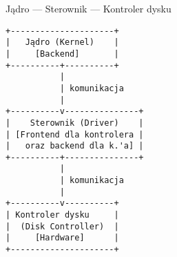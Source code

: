 \documentclass[10pt,compress,usenames,dvipsnames,aspectratio=169]{beamer}
\begin{document}
\begin{frame}[fragile]{Jądro — Sterownik — Kontroler dysku}
  \vfill
  \begin{center}
    \begin{minipage}{0.4\textwidth}
      {\scriptsize
      \begin{lstlisting}[style=dark, basicstyle=\ttfamily\scriptsize\color{fgcode}, numbers=none, xleftmargin=1em, xrightmargin=1em]
+---------------------+
|   Jądro (Kernel)    |
|     [Backend]       |
+----------+----------+
           |
           | komunikacja
           |
+----------v---------------+
|    Sterownik (Driver)    |
| [Frontend dla kontrolera |
|   oraz backend dla k.'a] |
+----------+---------------+
           |
           | komunikacja
           |
+----------v----------+
| Kontroler dysku     |
|  (Disk Controller)  |
|     [Hardware]      |
+---------------------+
      \end{lstlisting}
      }
    \end{minipage}
  \end{center}
  \vfill
\end{frame}
\end{document}
